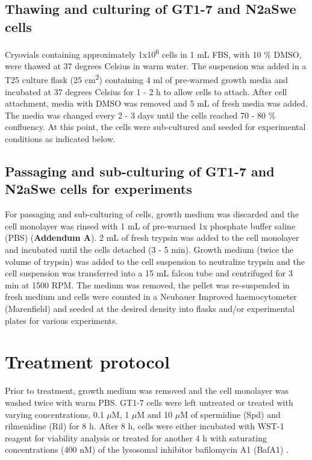\subsection{Thawing and culturing of GT1-7 and N2aSwe cells}
Cryovials containing approximately 1x10\textsuperscript{6} cells in 1 mL FBS, with 10 \% DMSO, were thawed at 37 degrees Celsius in warm water. The suspension was added in a T25 culture flask (25 cm\textsuperscript{2}) containing 4 ml of pre-warmed growth media and incubated at 37 degrees Celsius for 1 - 2 h to allow cells to attach. After cell attachment, media with DMSO was removed and 5 mL of fresh media was added. The media was changed every 2 - 3 days until the cells reached 70 - 80 \% confluency. At this point, the cells were sub-cultured and seeded for experimental conditions as indicated below.

\subsection{Passaging and sub-culturing of GT1-7 and N2aSwe cells for experiments}\label{sec:Passaging_subculturing_GT1-7_N2aSwe_experiments}
For passaging and sub-culturing of cells, growth medium was discarded and the cell monolayer was rinsed with 1 mL of pre-warmed 1x phosphate buffer saline (PBS) (\textbf{Addendum A}). 2 mL of fresh trypsin was added to the cell monolayer and incubated until the cells detached (3 - 5 min). Growth medium (twice the volume of trypsin) was added to the cell suspension to neutralize trypsin and the cell suspension was transferred into a 15 mL falcon tube and centrifuged for 3 min at 1500 RPM. The medium was removed, the pellet was re-suspended in fresh medium and cells were counted in a Neubauer Improved haemocytometer (Marenfield) and seeded at the desired density into flasks and/or experimental plates for various experiments.

\section{Treatment protocol}
Prior to treatment, growth medium was removed and the cell monolayer was washed twice with warm PBS. GT1-7 cells were left untreated or treated with varying concentrations, 0.1 $\mu$M, 1 $\mu$M and 10 $\mu$M of spermidine (Spd) and rilmenidine (Ril) for 8 h. After 8 h, cells were either incubated with WST-1 reagent for viability analysis or treated for another 4 h with saturating concentrations (400 nM) of the lysosomal inhibitor bafilomycin A1 (BafA1) \citep{DuToit2018b,loos2014}.

